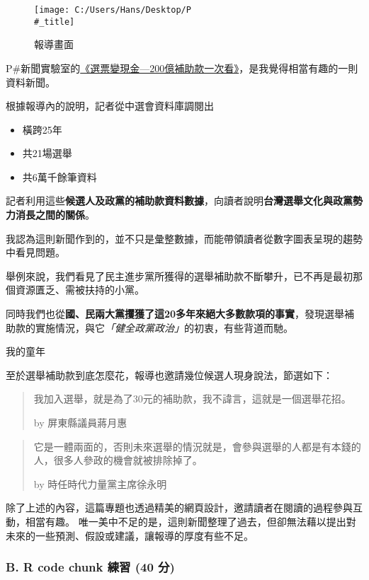 \documentclass[
]{article}
\providecommand{\tightlist}{%
  \setlength{\itemsep}{0pt}\setlength{\parskip}{0pt}}
\begin{document}
\begin{figure}
\centering
\texttt{[image: C:/Users/Hans/Desktop/P\\\#\_title]}
\caption{報導畫面}
\end{figure}

P\#新聞實驗室的\href{https://newmedia.pts.org.tw/subsidy/}{《選票變現金---200億補助款一次看》}，是我覺得相當有趣的一則資料新聞。

根據報導內的說明，記者從中選會資料庫調閱出

\begin{itemize}
\tightlist
\item
  橫跨25年
\item
  共21場選舉
\item
  共6萬千餘筆資料
\end{itemize}

記者利用這些\textbf{候選人及政黨的補助款資料數據}，向讀者說明\textbf{台灣選舉文化與政黨勢力消長之間的關係}。

我認為這則新聞作到的，並不只是彙整數據，而能帶領讀者從數字圖表呈現的趨勢中看見問題。

舉例來說，我們看見了民主進步黨所獲得的選舉補助款不斷攀升，已不再是最初那個資源匱乏、需被扶持的小黨。

同時我們也從\textbf{國、民兩大黨攫獲了這20多年來絕大多數款項的事實}，發現選舉補助款的實施情況，與它\emph{「健全政黨政治」}的初衷，有些背道而馳。

我的童年

至於選舉補助款到底怎麼花，報導也邀請幾位候選人現身說法，節選如下：

\begin{quote}
我加入選舉，就是為了30元的補助款，我不諱言，這就是一個選舉花招。

by 屏東縣議員蔣月惠
\end{quote}

\begin{quote}
它是一體兩面的，否則未來選舉的情況就是，會參與選舉的人都是有本錢的人，很多人參政的機會就被排除掉了。

by 時任時代力量黨主席徐永明
\end{quote}

除了上述的內容，這篇專題也透過精美的網頁設計，邀請讀者在閱讀的過程參與互動，相當有趣。
唯一美中不足的是，這則新聞整理了過去，但卻無法藉以提出對未來的一些預測、假設或建議，讓報導的厚度有些不足。

\hypertarget{b.-r-code-chunk-ux7df4ux7fd2-40-ux5206}{%
\subsubsection{B. R code chunk 練習 (40
分)}\label{b.-r-code-chunk-ux7df4ux7fd2-40-ux5206}}
\end{document}
